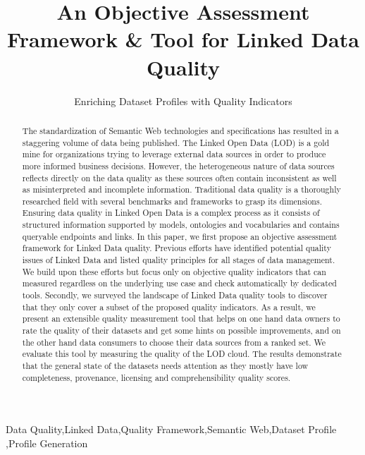 \documentclass[onecolumn, crcready]{../../Tools/LaTEX/iosart2c}
\begin{document}
\begin{frontmatter}

\title{An Objective Assessment Framework \& Tool for Linked Data Quality}
\subtitle{Enriching Dataset Profiles with Quality Indicators}


\begin{abstract}
The standardization of Semantic Web technologies and specifications has resulted in a staggering volume of data being published. The Linked Open Data (LOD) is a gold mine for organizations trying to leverage external data sources in order to produce more informed business decisions. However, the heterogeneous nature of data sources reflects directly on the data quality as these sources often contain inconsistent as well as misinterpreted and incomplete information. Traditional data quality is a thoroughly researched field with several benchmarks and frameworks to grasp its dimensions. Ensuring data quality in Linked Open Data is a complex process as it consists of structured information supported by models, ontologies and vocabularies and contains queryable endpoints and links. In this paper, we first propose an objective assessment framework for Linked Data quality. Previous efforts have identified potential quality issues of Linked Data and listed quality principles for all stages of data management. We build upon these efforts but focus only on objective quality indicators that can measured regardless on the underlying use case and check automatically by dedicated tools. Secondly, we surveyed the landscape of Linked Data quality tools to discover that they only cover a subset of the proposed quality indicators. As a result, we present an extensible quality measurement tool that helps on one hand data owners to rate the quality of their datasets and get some hints on possible improvements, and on the other hand data consumers to choose their data sources from a ranked set. We evaluate this tool by measuring the quality of the LOD cloud. The results demonstrate that the general state of the datasets needs attention as they mostly have low completeness, provenance, licensing and comprehensibility quality scores.
\end{abstract}

\begin{keyword}
Data Quality\sep Linked Data\sep Quality Framework\sep Semantic Web\sep Dataset Profile \sep Profile Generation
\end{keyword}
\end{frontmatter}
\end{document}
